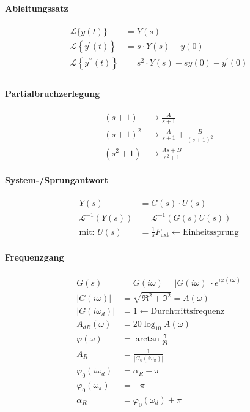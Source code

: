 \documentclass{article}
\begin{document}
\begin{landscape}
\begin{multicols}{2}
\begin{multicols}{2}
\begin{multicols}{2}
\paragraph*{Ableitungssatz}
\begin{align*}
	\mathcal{L}\{y(t)\} &=Y(s) \\
	\mathcal{L}\left\{y^{\prime}(t)\right\} &=s \cdot Y(s)-y(0)  \\
	\mathcal{L}\left\{y^{\prime \prime}(t)\right\}&=s^{2} \cdot Y(s)-s y(0)-y^{\prime}(0) \\
\end{align*}

\paragraph*{Partialbruchzerlegung}
\begin{align*}
	(s+1) &\rightarrow \frac{A}{s+1} \\ 
	(s+1)^2 &\rightarrow \frac{A}{s+1} + \frac{B}{(s+1)^2} \\
	(s^2+1) &\rightarrow \frac{As+B}{s^2+1}
\end{align*}

\paragraph{System-/Sprungantwort}
	\begin{align*}
		Y(s) & =G(s) \cdot U(s) \\
		\mathcal{L}^{-1}(Y(s)) &= \mathcal{L}^{-1}(G(s)U(s)) \\
		\text{mit: } U(s) &= \frac{1}{s}F_{\text{ext}} \leftarrow \text{Einheitssprung} 
	\end{align*}
\paragraph{Frequenzgang}
	\begin{align*}
		G(s) & =G(i\omega) = |G(i\omega)| \cdot e^{i\varphi(i\omega)} \\
		|G(i\omega)| &= \sqrt{\Re^2 + \Im^2} = A(\omega)\\
		|G(i\omega_d)| &=1 \leftarrow \text{Durchtrittsfrequenz} \\
		A_{dB}(\omega) &= 20\log_{10} A(\omega)\\
		\varphi(\omega) &= \arctan{\frac{\Im}{\Re}}\\
		A_R &= \frac{1}{|G_0(i\omega_\pi)|} \\
		\varphi_0(i\omega_d) &= \alpha_R - \pi \\
		\varphi_0(\omega_\pi) &= -\pi \\
		\alpha_R &= \varphi_0(\omega_d)+\pi \\
	\end{align*}



\end{multicols}
\end{multicols}
\end{multicols}
\end{landscape}
\end{document}
